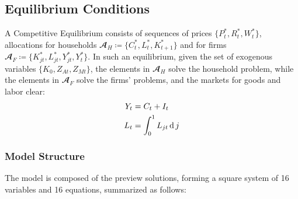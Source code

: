 \documentclass[
thesis.tex
]{subfiles}
\begin{document}
	\subsection{Equilibrium Conditions}
	
	
	A Competitive Equilibrium consists of sequences of prices $\{P_t^\ast, R_t^\ast, W_t^\ast\}$, allocations for households $\mathbfscr{A}_H \coloneq \{C_t^\ast, L_t^\ast, K_{t+1}^\ast\}$ and for firms $\mathbfscr{A}_F \coloneq \{K_{jt}^\ast, L_{jt}^\ast, Y_{jt}^\ast, Y_t^\ast\}$. In such an equilibrium, given the set of exogenous variables $\{K_0, Z_{At}, Z_{Mt}\}$, the elements in $\mathbfscr{A}_H$ solve the household problem, while the elements in $\mathbfscr{A}_F$ solve the firms' problems, and the markets for goods and labor clear:
	\begin{align}
		Y_t &= C_t + I_t \label{eq_v0:market-clearing-condition} \\
		L_t &= \int_{0}^{1} L_{jt} \operatorname{d} j \label{eq_v0:market-clearing-condition-2}
	\end{align}
	
	
	
	\subsubsection{Model Structure}
	
	The model is composed of the preview solutions, forming a square system of 16 variables and 16 equations, summarized as follows:
	
\end{document}
